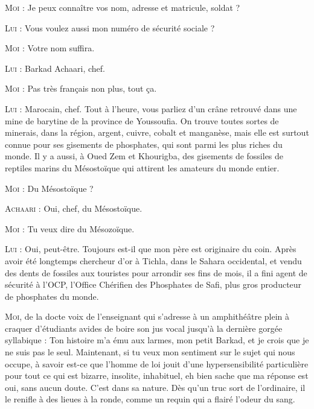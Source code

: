 \begin{dialogue}

\textsc{Moi} : Je peux connaître vos nom, adresse et matricule, soldat ?

\textsc{Lui} : Vous voulez aussi mon numéro de sécurité sociale ?

\textsc{Moi} : Votre nom suffira.

\textsc{Lui} : Barkad Achaari, chef.

\textsc{Moi} : Pas très français non plus, tout ça.

\textsc{Lui} : Marocain, chef. Tout à l’heure, vous parliez d’un crâne retrouvé dans une mine de barytine de la province de Youssoufia. On trouve toutes sortes de minerais, dans la région, argent, cuivre, cobalt et manganèse, mais elle est surtout connue pour ses gisements de phosphates, qui sont parmi les plus riches du monde. Il y a aussi, à Oued Zem et Khourigba, des gisements de fossiles de reptiles marins du Mésostoïque qui attirent les amateurs du monde entier.

\textsc{Moi} : Du Mésostoïque ?

\textsc{Achaari} : Oui, chef, du Mésostoïque.

\textsc{Moi} : Tu veux dire du Mésozoïque.

%

\textsc{Lui} : Oui, peut-être. Toujours est-il que mon père est originaire du coin. Après avoir été longtemps chercheur d’or à Tichla, dans le Sahara occidental, et vendu des dents de fossiles aux touristes pour arrondir ses fins de mois, il a fini agent de sécurité à l’OCP, l’Office Chérifien des Phosphates de Safi, plus gros producteur de phosphates du monde.

\textsc{Moi}, de la docte voix de l’enseignant qui s’adresse à un amphithéâtre plein à craquer d’étudiants avides de boire son jus vocal jusqu’à la dernière gorgée syllabique : Ton histoire m’a ému aux larmes, mon petit Barkad, et je crois que je ne suis pas le seul. Maintenant, si tu veux mon sentiment sur le sujet qui nous occupe, à savoir est-ce que l’homme de loi jouit d’une hypersensibilité particulière pour tout ce qui est bizarre, insolite, inhabituel, eh bien sache que ma réponse est oui, sans aucun doute. C’est dans sa nature. Dès qu’un truc sort de l’ordinaire, il le renifle à des lieues à la ronde, comme un requin qui a flairé l’odeur du sang.


\end{dialogue}
